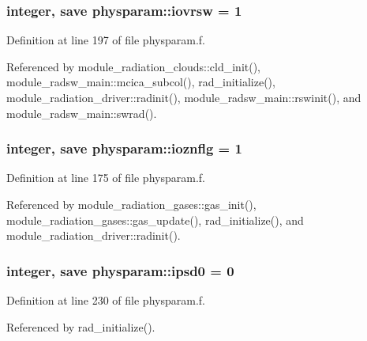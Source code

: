 \subsubsection[{\texorpdfstring{iovrsw}{iovrsw}}]{\setlength{\rightskip}{0pt plus 5cm}integer, save physparam\+::iovrsw = 1}\hypertarget{namespacephysparam_a2f0c4c2c8f4a93048ab2b84826498007}{}\label{namespacephysparam_a2f0c4c2c8f4a93048ab2b84826498007}


Definition at line 197 of file physparam.\+f.



Referenced by module\+\_\+radiation\+\_\+clouds\+::cld\+\_\+init(), module\+\_\+radsw\+\_\+main\+::mcica\+\_\+subcol(), rad\+\_\+initialize(), module\+\_\+radiation\+\_\+driver\+::radinit(), module\+\_\+radsw\+\_\+main\+::rswinit(), and module\+\_\+radsw\+\_\+main\+::swrad().

\subsubsection[{\texorpdfstring{ioznflg}{ioznflg}}]{\setlength{\rightskip}{0pt plus 5cm}integer, save physparam\+::ioznflg = 1}\hypertarget{namespacephysparam_a90d63a1a0c04479f586ce21df72d36b7}{}\label{namespacephysparam_a90d63a1a0c04479f586ce21df72d36b7}


Definition at line 175 of file physparam.\+f.



Referenced by module\+\_\+radiation\+\_\+gases\+::gas\+\_\+init(), module\+\_\+radiation\+\_\+gases\+::gas\+\_\+update(), rad\+\_\+initialize(), and module\+\_\+radiation\+\_\+driver\+::radinit().

\subsubsection[{\texorpdfstring{ipsd0}{ipsd0}}]{\setlength{\rightskip}{0pt plus 5cm}integer, save physparam\+::ipsd0 = 0}\hypertarget{namespacephysparam_adadc8b256d78414cf84290d1bec23fe6}{}\label{namespacephysparam_adadc8b256d78414cf84290d1bec23fe6}


Definition at line 230 of file physparam.\+f.



Referenced by rad\+\_\+initialize().

